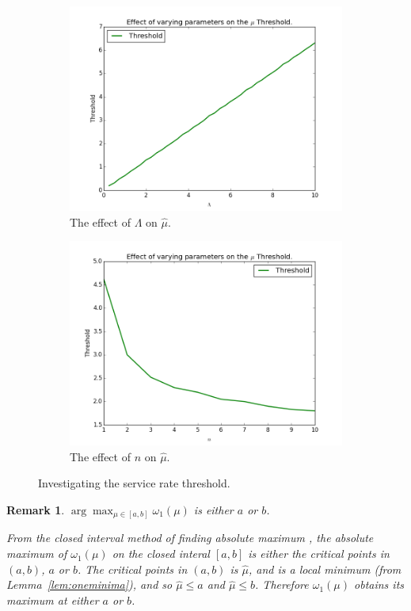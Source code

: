 \documentclass{article}
\newtheorem{remark}{Remark}
\begin{document}
\begin{figure}[!htbp]
\begin{subfigure}[b]{0.5\textwidth}
    \includegraphics[width=\textwidth]{images/plot_thresholds_L}
    \caption{The effect of $\Lambda$ on $\hat{\mu}$.}
    \label{fig:threshold_L}
  \end{subfigure}
  \begin{subfigure}[b]{0.5\textwidth}
    \includegraphics[width=\textwidth]{images/plot_thresholds_n}
    \caption{The effect of $n$ on $\hat{\mu}$.}
    \label{fig:threshold_n}
  \end{subfigure}
  \caption{Investigating the service rate threshold.}
  \label{fig:threshold_investigate}
\end{figure}

\begin{remark}\label{rem:findmaximum}
$\arg\max_{\mu \in [a, b]} \omega_1(\mu)$ is either $a$ or $b$.

From the closed interval method of finding absolute maximum \cite{tan09}, the absolute maximum of $\omega_1(\mu)$ on the closed interal $[a, b]$ is either the critical points in $(a, b)$, $a$ or $b$.
The critical points in $(a, b)$ is $\hat{\mu}$, and is a local minimum (from Lemma~\ref{lem:oneminima}), and so $\hat{\mu} \leq a$ and $\hat{\mu} \leq b$.
Therefore $\omega_1(\mu)$ obtains its maximum at either $a$ or $b$.
\end{remark}
\end{document}
